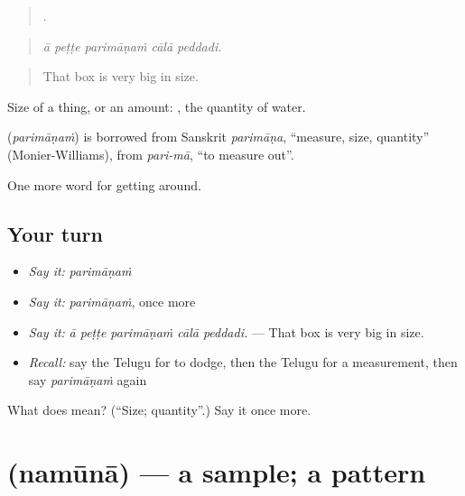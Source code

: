 \begin{quote}
    .
\end{quote}

\begin{quote}
\emph{ā peṭṭe parimāṇaṁ cālā peddadi.}
\end{quote}

\begin{quote}
That box is very big in size.
\end{quote}

Size of a thing, or an amount:  , the quantity of water.

\begin{cousinweb}
\textbf{} (\emph{parimāṇaṁ}) is borrowed from Sanskrit \emph{parimāṇa}, \textquotedblleft{}measure, size, quantity\textquotedblright{} (Monier-Williams), from \emph{pari-mā}, \textquotedblleft{}to measure out\textquotedblright{}.
\end{cousinweb}

\begin{grammarlens}[title={What you've built}]
One more word for getting around.
\end{grammarlens}

\subsection*{Your turn}
\begin{itemize}
\raggedright
  \item \emph{Say it:} \emph{parimāṇaṁ}
  \item \emph{Say it:} \emph{parimāṇaṁ}, once more
  \item \emph{Say it:} \emph{ā peṭṭe parimāṇaṁ cālā peddadi.} — That box is very big in size.
  \item \emph{Recall:} say the Telugu for to dodge, then the Telugu for a measurement, then say \emph{parimāṇaṁ} again
\end{itemize}

\begin{tcolorbox}[breakable,colback=teal!4,colframe=teal!35!black,title={Before you move on}]
What does  mean? (\textquotedblleft{}Size; quantity\textquotedblright{}.) Say it once more.
\end{tcolorbox}
\section[\texorpdfstring{\te{నమూనా} (namūnā)}{నమూనా (namūnā)}]{ (namūnā) — a sample; a pattern}

